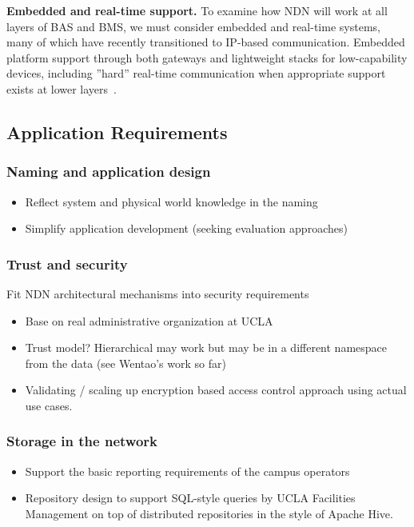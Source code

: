 {\bf Embedded and real-time support.}  To examine how NDN will work at all layers of BAS and BMS, we must consider embedded and real-time systems, many of which have recently transitioned to IP-based communication.  Embedded platform support through both gateways and lightweight stacks for low-capability devices, including ''hard'' real-time communication when appropriate support exists at lower 
layers~\cite{loeser2004low, skeie2006timeliness}.

\subsection{Application Requirements}



\subsubsection{Naming and application design}
\begin{itemize}
\item Reflect system and physical world knowledge in the naming 
\item Simplify application development (seeking evaluation approaches)
\end{itemize}

\subsubsection{Trust and security}
Fit NDN architectural mechanisms into security requirements
\begin{itemize}
\item Base on real administrative organization at UCLA
\item Trust model? Hierarchical may work but may be in a different namespace from the data  (see Wentao’s work so far) 
\item Validating / scaling up encryption based access control approach using actual use cases.
\end{itemize}

\subsubsection{Storage in the network}
\begin{itemize}
\item Support the basic reporting requirements of the campus operators
\item Repository design to support SQL-style queries by UCLA Facilities Management on top of distributed repositories in the style of Apache Hive. 
\end{itemize}
